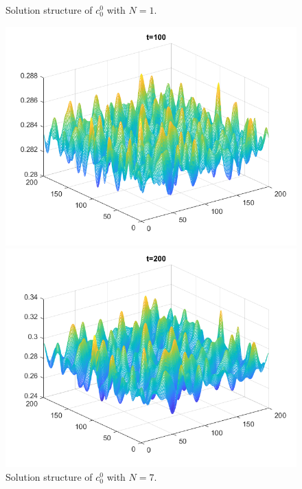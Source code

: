 \begin{frame}
\begin{figure}[H]
		\vspace{1ex}
		\centering
		Solution structure of \(c^0_0\) with \(N = 1\).
		
		\vspace{2ex}
		
		\begin{minipage}{0.4\textwidth}
			\centering
			\includegraphics[scale=0.25]{Bilder_wxwy/14th_t=100_mx=my=200_random_Dr=1_(1.d0+(1.d-2rand(0)-5.d-4))Divide(2.d0dsqrt(pi))}
		\end{minipage}
		\hfill 
		\begin{minipage}{0.4\textwidth}
			\centering
			\includegraphics[scale=0.25]{Bilder_wxwy/14th_t=200_mx=my=200_random_Dr=1_(1.d0+(1.d-2rand(0)-5.d-4))Divide(2.d0dsqrt(pi))}
		\end{minipage}
		
		\caption{Solution structure of \(c^0_0\) with \(N = 7\).}
	\end{figure}
\end{frame}



